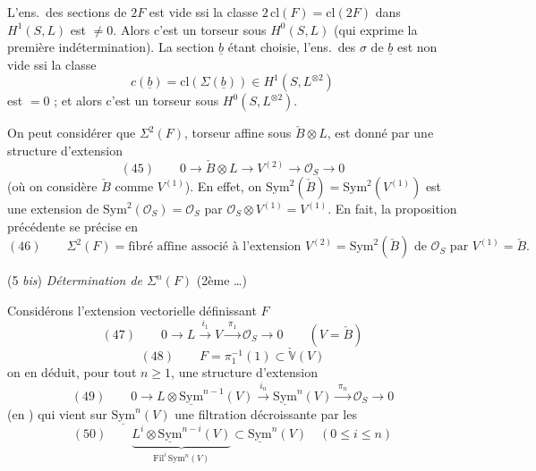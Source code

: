 \documentclass[11pt,a4paper]{article}
\begin{document}
L'ens.\ des sections de $2F$  \struck{\ill{})}  est vide ssi la classe $2\,\mathrm{cl}(F) = \mathrm{cl}(2F)$ dans $H^1(S, L)$ est $\neq 0$. Alors c'est un torseur sous $H^0(S, L)$ (qui exprime la première indétermination). La section $\underline{b}$ étant choisie, l'ens.\ des $\sigma$  de $\underline{b}$ est non vide ssi la classe
\[
c(\underline{b}) = \mathrm{cl}(\Sigma(\underline{b})) \in H^1(S, L^{\otimes 2})
\]
est $= 0$ ; et alors c'est un torseur sous $H^0(S, L^{\otimes 2})$.

On peut considérer que $\Sigma^2(F)$, torseur affine sous $\check{B} \otimes L$, est donné par une structure d'extension
\[
(45)\qquad 0 \to \check{B} \otimes L \longrightarrow V^{(2)} \longrightarrow \mathcal{O}_S \to 0
\]
(où on considère $\check{B}$ comme $V^{(1)}$). En effet, on  $\mathrm{Sym}^2(\check{B}) = \mathrm{Sym}^2(V^{(1)})$ est une extension de $\mathrm{Sym}^2(\mathcal{O}_S) = \mathcal{O}_S$ par $\mathcal{O}_S \otimes V^{(1)} = V^{(1)}$. En fait, la proposition précédente se précise en
\[
(46)\qquad \Sigma^2(F) = \text{fibré affine associé à l'extension } V^{(2)} = \mathrm{Sym}^2(\check{B}) \text{ de } \mathcal{O}_S \text{ par } V^{(1)} = \check{B} .
\]

(5 \emph{bis}) \emph{Détermination de $\Sigma^n(F)$} (2ème  …)

Considérons l'extension vectorielle définissant  $F$
\[
(47)\qquad 0 \to L \xrightarrow{\;i_1\;} V \xrightarrow{\;\pi_1\;} \mathcal{O}_S \to 0 \qquad (V = \check{B})
\]
\[
(48)\qquad F = \pi_1^{-1}(1) \subset \check{\mathbb{V}}(V)
\]
on en déduit, pour tout $n \ge 1$, une structure d'extension
\[
(49)\qquad 0 \to L \otimes \underline{\mathrm{Sym}}^{n-1}(V) \xrightarrow{\;i_n\;} \underline{\mathrm{Sym}}^n(V) \xrightarrow{\;\pi_n\;} \mathcal{O}_S \to 0
\]
(en ) qui vient \struck{\ill{}} sur $\underline{\mathrm{Sym}}^n(V)$ une filtration décroissante par les
\[
(50)\qquad \underbrace{L^{i} \otimes \underline{\mathrm{Sym}}^{n-i}(V)}_{\mathrm{Fil}^i\, \mathrm{Sym}^n(V)} \subset \underline{\mathrm{Sym}}^n(V) \quad (0 \le i \le n)
\]
\end{document}
